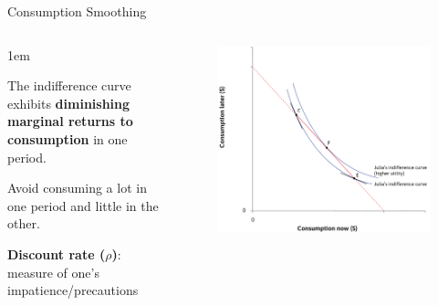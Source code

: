 \documentclass[11pt,aspectratio=43,usenames,dvipsnames]{beamer}
\let\olditemize=\itemize
\let\endolditemize=\enditemize
\renewenvironment{itemize}{\olditemize \itemsep1em}{\endolditemize}
\theoremstyle{definition}
\begin{document}
\begin{frame}{Consumption Smoothing}
\label{slide:Consumption_Smoothing}
    \begin{columns}
        \begin{column}{0.5\textwidth}
            \begin{itemize}
                \item The indifference curve exhibits \textbf{diminishing marginal returns to consumption} in one period.
                \item \alert{Avoid consuming a lot in one period and little in the other.}
                \item \textbf{Discount rate ($ \rho $)}: measure of one's impatience/precautions
            \end{itemize}
        \end{column}
        \begin{column}{0.5\textwidth}
            \begin{figure}
                \centering
                \includegraphics[width=\textwidth]{./figures/Figure3.png}
            \end{figure}

        \end{column}
    \end{columns}
\end{frame}
\end{document}
